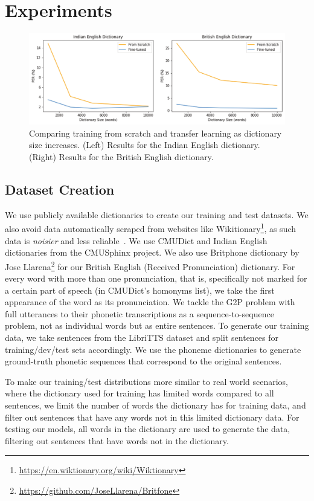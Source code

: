 \section{Experiments}
\begin{figure}
  \includegraphics[width=\linewidth]{figures/g2p_results.pdf}
   \caption{Comparing training from scratch and transfer learning as dictionary size increases.  (Left) Results for the Indian English dictionary.  (Right) Results for the British English dictionary.}
   \label{fig:britishresults}
\end{figure}

\subsection{Dataset Creation} 
We use publicly available dictionaries to create our training and test datasets. We also avoid data automatically scraped from websites like Wikitionary\footnote{\url{https://en.wiktionary.org/wiki/Wiktionary}}, as such data is \emph{noisier} and less reliable~\cite{schlippe2010wiktionary}. We use CMUDict\cite{weide2005carnegie} and Indian English dictionaries from the CMUSphinx project. We also use Britphone dictionary by Jose Llarena\footnote{\url{https://github.com/JoseLlarena/Britfone}} for our British English (Received Pronunciation) dictionary. For every word with more than one pronunciation, that is, specifically not marked for a certain part of speech (in CMUDict's homonyms list), we take the first appearance of the word as its pronunciation. We tackle the G2P problem with full utterances to their phonetic transcriptions as a sequence-to-sequence problem, not as individual words but as entire sentences. To generate our training data, we take sentences from the LibriTTS\cite{zen2019libritts} dataset and split sentences for training/dev/test sets accordingly. We use the phoneme dictionaries to generate ground-truth phonetic sequences that correspond to the original sentences.

To make our training/test distributions more similar to real world scenarios, where the dictionary used for training has limited words compared to all sentences, we limit the number of words the dictionary has for training data, and filter out sentences that have any words not in this limited dictionary data. For testing our models, all words in the dictionary are used to generate the data, filtering out sentences that have words not in the dictionary.

